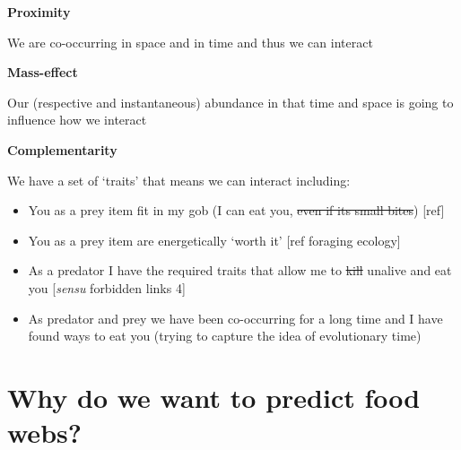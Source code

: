 \documentclass[
]{article}
\providecommand{\tightlist}{%
  \setlength{\itemsep}{0pt}\setlength{\parskip}{0pt}}\usepackage{longtable,booktabs,array}
\begin{document}
\begin{tcolorbox}[enhanced jigsaw, title=\textcolor{quarto-callout-note-color}{\faInfo}\hspace{0.5em}{Box 1 - Mechanisms that determine feeding links}, breakable, rightrule=.15mm, colframe=quarto-callout-note-color-frame, colbacktitle=quarto-callout-note-color!10!white, arc=.35mm, leftrule=.75mm, toptitle=1mm, colback=white, toprule=.15mm, opacitybacktitle=0.6, opacityback=0, bottomtitle=1mm, titlerule=0mm, bottomrule=.15mm, left=2mm, coltitle=black]

\textbf{Proximity}

We are co-occurring in space and in time and thus we can interact

\textbf{Mass-effect}

Our (respective and instantaneous) abundance in that time and space is
going to influence how we interact

\textbf{Complementarity}

We have a set of `traits' that means we can interact including:

\begin{itemize}
\tightlist
\item
  You as a prey item fit in my gob (I can eat you, \st{even if its small
  bites}) {[}ref{]}
\item
  You as a prey item are energetically `worth it' {[}ref foraging
  ecology{]}
\item
  As a predator I have the required traits that allow me to \st{kill}
  unalive and eat you {[}\emph{sensu} forbidden links 4{]}
\item
  As predator and prey we have been co-occurring for a long time and I
  have found ways to eat you (trying to capture the idea of evolutionary
  time)
\end{itemize}

\end{tcolorbox}

\section{Why do we want to predict food webs?}\label{sec-network-why}
\end{document}
